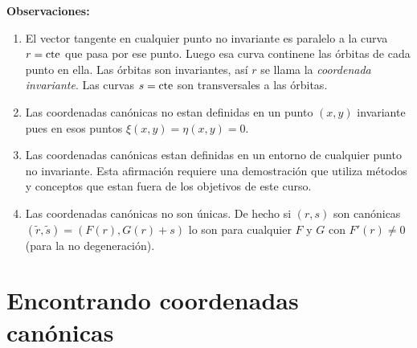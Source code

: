 \noindent\textbf{Observaciones:}
\begin{enumerate}
\item El vector tangente en cualquier punto no invariante es paralelo a la curva $r=\hbox{cte}$ que pasa por ese punto. Luego esa curva continene las órbitas de cada punto en ella. Las órbitas son invariantes, así  $r$ se llama la \emph{coordenada invariante}. Las curvas $s=\hbox{cte}$ son transversales a las órbitas.
\item Las coordenadas canónicas no estan definidas en un punto $(x,y)$ invariante pues en esos puntos $\xi(x,y)=\eta(x,y)=0$.

\item Las coordenadas canónicas estan definidas en un entorno de cualquier   punto no invariante. Esta afirmación requiere una demostración que utiliza métodos y conceptos que estan fuera de los objetivos de este curso.

\item Las coordenadas canónicas no son únicas. De hecho si $(r,s)$ son canónicas $(\tilde{r},\tilde{s})=(F(r),G(r)+s)$ lo son para cualquier $F$ y $G$ con $F'(r)\neq 0$ (para la no degeneración).

\end{enumerate}

% 
% 
% 
% 
% 
% 
% 
% 




\section{Encontrando coordenadas canónicas}

